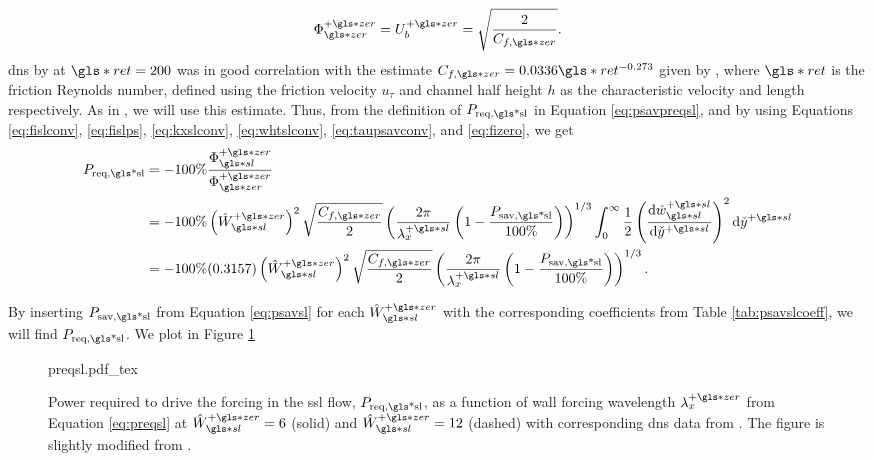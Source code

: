 \begin{equation}
	\Phi\pz\zz=U_b\pz=\sqrt{\frac{2}{C_{f,\gls*{zer}}}} \label{eq:fizero}
.\end{equation}
\gls{dns} by \textcite{viotti2009} at $\gls*{ret}=200$ was in good correlation with the estimate $C_{f,\gls*{zer}}=0.0336 \gls*{ret}^{-0.273}$ given by \cite{pope2001}, where $\gls*{ret}$ is the friction Reynolds number, defined using the friction velocity $u_\tau$ and channel half height  $h$ as the characteristic velocity and length respectively. As in \cite{viotti2009,chernyshenko2013}, we will use this estimate.
Thus, from the definition of $P_\text{req,\gls*{sl}} $ in Equation \eqref{eq:psavpreqsl}, and by using Equations \eqref{eq:fislconv}, \eqref{eq:fislps}, \eqref{eq:kxslconv}, \eqref{eq:whtslconv}, \eqref{eq:taupsavconv}, and \eqref{eq:fizero}, we get
\begin{align}
	P_\text{req,\gls*{sl}}&=-100\%\frac{\Phi \pz\ssl}{\Phi \pz\zz}\\
			      &=-100\%\left( \hat{W}\ssl\pz \right)^2 \sqrt{\frac{C_{f,\gls*{zer}}}{2}} \left( \frac{2\pi}{\lambda_x\ps}\left( 1-\frac{P_\text{sav,\gls*{sl}} }{100\%} \right)  \right) ^{1 /3}  \int_{0}^{\infty}\frac{1}{2} \left( \dv{\check{w}\ssl\ps}{\check{y}\ps}  \right) ^2 \dd{\check{y}\ps}\\
			      &=-100\%(0.3157)\left( \hat{W}\ssl\pz \right)^2 \sqrt{\frac{C_{f,\gls*{zer}}}{2}} \left( \frac{2\pi}{\lambda_x\ps}\left( 1-\frac{P_\text{sav,\gls*{sl}} }{100\%} \right)  \right) ^{1 /3}\label{eq:preqsl}
.\end{align}

By inserting $P_\text{sav,\gls*{sl}} $ from Equation \eqref{eq:psavsl} for each $\hat{W}\ssl\pz$ with the corresponding coefficients from Table \ref{tab:psavslcoeff}, we will find $P_\text{req,\gls*{sl}} $. We plot  in Figure \ref{fig:preqsl}

\begin{figure}[htbp]
	\centering
	\def\svgwidth{0.7\textwidth}
	{preqsl.pdf_tex}
	\caption[$P_\text{req,\gls*{sl}} $ as a function of wall forcing wavelength $\lambda_x\pz$]{Power required to drive the forcing in the  \gls{ssl} flow, $P_\text{req,\gls*{sl}} $, as a function of wall forcing wavelength $\lambda_x\pz$ from Equation \eqref{eq:preqsl} at $\hat{W}\pz\ssl=6$ (solid) and $\hat{W}\pz\ssl=12$ (dashed) with corresponding \gls{dns} data from \textcite{viotti2009}. The figure is slightly modified from \cite{chernyshenko2013}.} 
	\label{fig:preqsl}
\end{figure}

